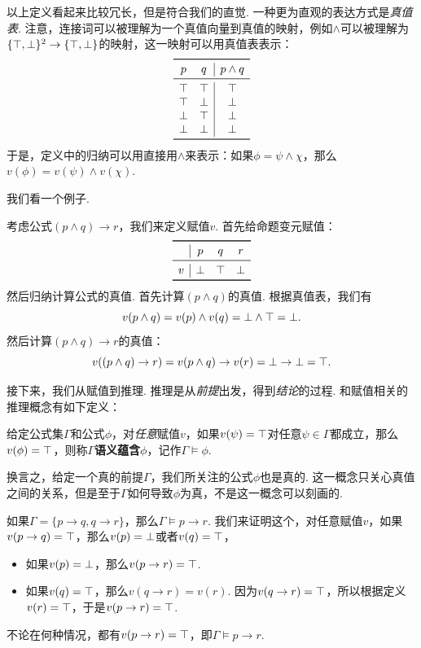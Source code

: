 以上定义看起来比较冗长，但是符合我们的直觉. 一种更为直观的表达方式是\textit{真值表}. 注意，连接词可以被理解为一个真值向量到真值的映射，例如$\wedge$可以被理解为$\{\top,\bot\}^2\to\{\top,\bot\}$的映射，这一映射可以用真值表表示：
\[
\begin{array}{cc|c}
    \toprule
    p & q & p\wedge q \\\midrule
    \T & \T & \T \\
    \T & \F & \F \\
    \F & \T & \F \\
    \F & \F & \F \\
    \bottomrule
\end{array}
\]
于是，定义中的归纳可以用直接用$\wedge$来表示：如果$\phi=\psi\wedge\chi$，那么$v(\phi)=v(\psi)\wedge v(\chi)$.

我们看一个例子. 

\begin{example}
    考虑公式$(p\wedge q)\to r$，我们来定义赋值$v$. 首先给命题变元赋值：
    \[\begin{array}{c|ccc}
        \toprule
        &p&q&r\\\midrule
        v&\F&\T&\F\\
        \bottomrule
    \end{array}\]
    然后归纳计算公式的真值. 首先计算$(p\wedge q)$的真值. 根据真值表，我们有
    \[v(p\wedge q)=v(p)\wedge v(q)=\bot\wedge\top=\bot.\]
    然后计算$(p\wedge q)\to r$的真值：
    \[v((p\wedge q)\to r)=v(p\wedge q)\to v(r)=\bot\to\bot=\top.\]    
\end{example}

接下来，我们从赋值到推理. 推理是从\textit{前提}出发，得到\textit{结论}的过程. 和赋值相关的推理概念有如下定义：

\begin{definition}[语义蕴含]
给定公式集$\Gamma$和公式$\phi$，对\textit{任意}赋值$v$，如果$v(\psi)=\top$对任意$\psi\in\Gamma$都成立，那么$v(\phi)=\top$，则称$\Gamma$\textbf{语义蕴含}$\phi$，记作$\Gamma\vDash\phi$.
\end{definition}

换言之，给定一个真的前提$\Gamma$，我们所关注的公式$\phi$也是真的. 这一概念只关心真值之间的关系，但是至于$\Gamma$如何导致$\phi$为真，不是这一概念可以刻画的. 

\begin{example}\label{example:semantic-implication}
如果$\Gamma=\{p\to q,q\to r\}$，那么$\Gamma\vDash p\to r$. 我们来证明这个，对任意赋值$v$，如果$v(p\to q)=\top$，那么$v(p)=\bot$或者$v(q)=\top$，
\begin{itemize}
    \item 如果$v(p)=\bot$，那么$v(p\to r)=\top$.
    \item 如果$v(q)=\top$，那么$v(q\to r)=v(r)$. 因为$v(q\to r)=\top$，所以根据定义$v(r)=\top$，于是$v(p\to r)=\top$.
\end{itemize}
不论在何种情况，都有$v(p\to r)=\top$，即$\Gamma\vDash p\to r$.
\end{example}

